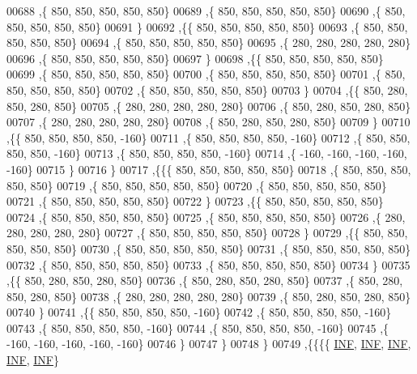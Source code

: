 \begin{DoxyCode}
00688    ,\{   850,   850,   850,   850,   850\}
00689    ,\{   850,   850,   850,   850,   850\}
00690    ,\{   850,   850,   850,   850,   850\}
00691    \}
00692   ,\{\{   850,   850,   850,   850,   850\}
00693    ,\{   850,   850,   850,   850,   850\}
00694    ,\{   850,   850,   850,   850,   850\}
00695    ,\{   280,   280,   280,   280,   280\}
00696    ,\{   850,   850,   850,   850,   850\}
00697    \}
00698   ,\{\{   850,   850,   850,   850,   850\}
00699    ,\{   850,   850,   850,   850,   850\}
00700    ,\{   850,   850,   850,   850,   850\}
00701    ,\{   850,   850,   850,   850,   850\}
00702    ,\{   850,   850,   850,   850,   850\}
00703    \}
00704   ,\{\{   850,   280,   850,   280,   850\}
00705    ,\{   280,   280,   280,   280,   280\}
00706    ,\{   850,   280,   850,   280,   850\}
00707    ,\{   280,   280,   280,   280,   280\}
00708    ,\{   850,   280,   850,   280,   850\}
00709    \}
00710   ,\{\{   850,   850,   850,   850,  -160\}
00711    ,\{   850,   850,   850,   850,  -160\}
00712    ,\{   850,   850,   850,   850,  -160\}
00713    ,\{   850,   850,   850,   850,  -160\}
00714    ,\{  -160,  -160,  -160,  -160,  -160\}
00715    \}
00716   \}
00717  ,\{\{\{   850,   850,   850,   850,   850\}
00718    ,\{   850,   850,   850,   850,   850\}
00719    ,\{   850,   850,   850,   850,   850\}
00720    ,\{   850,   850,   850,   850,   850\}
00721    ,\{   850,   850,   850,   850,   850\}
00722    \}
00723   ,\{\{   850,   850,   850,   850,   850\}
00724    ,\{   850,   850,   850,   850,   850\}
00725    ,\{   850,   850,   850,   850,   850\}
00726    ,\{   280,   280,   280,   280,   280\}
00727    ,\{   850,   850,   850,   850,   850\}
00728    \}
00729   ,\{\{   850,   850,   850,   850,   850\}
00730    ,\{   850,   850,   850,   850,   850\}
00731    ,\{   850,   850,   850,   850,   850\}
00732    ,\{   850,   850,   850,   850,   850\}
00733    ,\{   850,   850,   850,   850,   850\}
00734    \}
00735   ,\{\{   850,   280,   850,   280,   850\}
00736    ,\{   850,   280,   850,   280,   850\}
00737    ,\{   850,   280,   850,   280,   850\}
00738    ,\{   280,   280,   280,   280,   280\}
00739    ,\{   850,   280,   850,   280,   850\}
00740    \}
00741   ,\{\{   850,   850,   850,   850,  -160\}
00742    ,\{   850,   850,   850,   850,  -160\}
00743    ,\{   850,   850,   850,   850,  -160\}
00744    ,\{   850,   850,   850,   850,  -160\}
00745    ,\{  -160,  -160,  -160,  -160,  -160\}
00746    \}
00747   \}
00748  \}
00749 ,\{\{\{\{   \mbox{\hyperlink{energy__const_8h_a12c2040f25d8e3a7b9e1c2024c618cb6}{INF}},   \mbox{\hyperlink{energy__const_8h_a12c2040f25d8e3a7b9e1c2024c618cb6}{INF}},   \mbox{\hyperlink{energy__const_8h_a12c2040f25d8e3a7b9e1c2024c618cb6}{INF}},   \mbox{\hyperlink{energy__const_8h_a12c2040f25d8e3a7b9e1c2024c618cb6}{INF}},   \mbox{\hyperlink{energy__const_8h_a12c2040f25d8e3a7b9e1c2024c618cb6}{INF}}\}

\end{DoxyCode}
